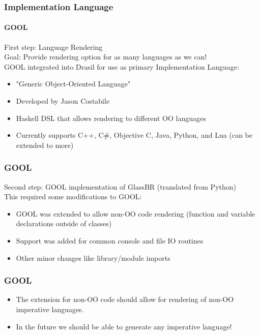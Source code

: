 \documentclass{beamer}
\begin{document}

\begin{frame}

\frametitle{Implementation Language}

\framesubtitle{GOOL}

First step:  Language Rendering\\[12pt]

Goal:  Provide rendering option for as many languages as we can!\\[12pt]

GOOL integrated into Drasil for use as primary Implementation Language:
\begin{itemize}
\item "Generic Object-Oriented Language"
\item Developed by Jason Costabile
\item Haskell DSL that allows rendering to different OO languages
\item Currently supports C++, C\#, Objective C, Java, Python, and Lua (can be extended to more)
\end{itemize}


\end{frame}


\begin{frame}

\frametitle{GOOL}
Second step:  GOOL implementation of GlassBR (translated from Python)\\[12pt]

This required some modifications to GOOL:
\begin{itemize}
\item GOOL was extended to allow non-OO code rendering (function and variable declarations outside of classes) 
\item Support was added for common console and file IO routines
\item Other minor changes like library/module imports
\end{itemize}


\end{frame}


\begin{frame}

\frametitle{GOOL}
\begin{itemize}
\item The extension for non-OO code should allow for rendering of non-OO imperative languages.
\item In the future we should be able to generate any imperative language!
\end{itemize}

\end{frame}
\end{document}
